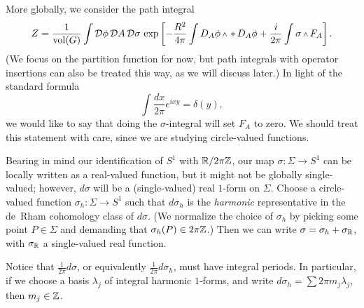 More globally, we consider the path integral
\begin{equation}\label{pathintegral}
Z=\frac1{\vol(G)}\int \cD \phi\,\cD A\,\cD\sigma\,\exp\left[
-\frac{R^2}{4\pi}\int D_A\phi\wdg\hstar D_A\phi
+ \frac{i}{2\pi}\int\sigma\wdg F_A
\right].
\end{equation}
(We focus on the partition function for now, but path integrals with operator
insertions can also be treated this way, as we will discuss later.)
In light of the standard formula
\begin{equation}
\int \frac{dx}{2\pi} e^{ixy}=\delta(y),
\end{equation}
we would like to say that doing the $\sigma$-integral will set $F_A$ to zero.
We should treat this statement with care, since we are studying circle-valued
functions.

Bearing in mind our identification of $S^1$ with ${\Bbb R}/2\pi{\Bbb Z}$, our map
$\sigma:\Sigma\to S^1$ can be locally
written as a real-valued function, but it might not be globally single-valued;
however, $d\sigma$ will be a (single-valued) real $1$-form on $\Sigma$.
Choose a circle-valued function $\sigma_h:\Sigma\to S^1$ such that
$d\sigma_h$ is the {\it harmonic}\/ representative in the de~Rham cohomology
class
of $d\sigma$.  (We normalize the choice of $\sigma_h$ by picking some point
$P\in\Sigma$
and demanding that $\sigma_h(P)\in 2\pi{\Bbb Z}$.)
Then we can write $\sigma=\sigma_h+\sigma_{{\Bbb R}}$, with $\sigma_{{\Bbb R}}$
a single-valued real function.

Notice that $\frac1{2\pi}d\sigma$, or equivalently $\frac1{2\pi}d\sigma_h$,
must have integral periods.
In particular, if
we choose a basis $\lambda_j$ of integral harmonic $1$-forms, and write
$d\sigma_h=\sum2\pi m_j\lambda_j$, then $m_j\in {\Bbb Z}$.

